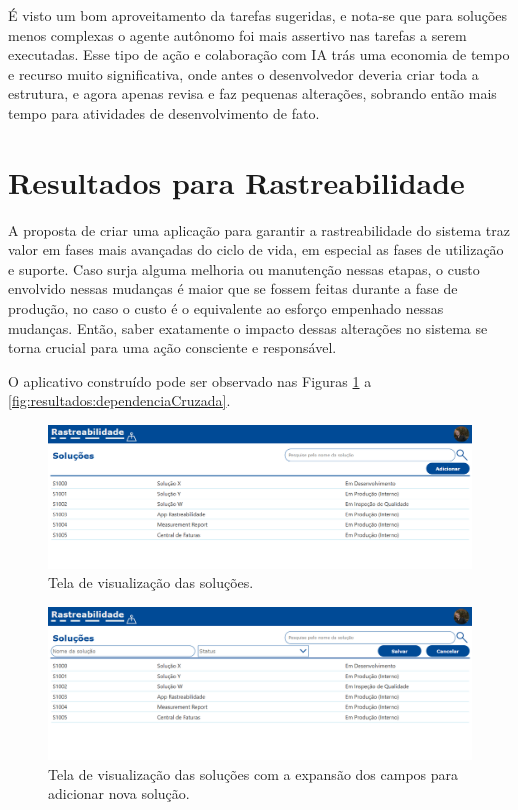 	É visto um bom aproveitamento da tarefas sugeridas, e nota-se que para soluções menos complexas o agente autônomo foi mais assertivo nas tarefas a serem executadas. Esse tipo de
	ação e colaboração com IA trás uma economia de tempo e recurso muito significativa, onde antes o desenvolvedor deveria criar toda a estrutura, e agora apenas revisa e faz pequenas alterações,
	sobrando então mais tempo para atividades de desenvolvimento de fato.

	\section{Resultados para Rastreabilidade}

	A proposta de criar uma aplicação para garantir a rastreabilidade do sistema traz valor em fases mais avançadas do ciclo de vida, em especial as fases de utilização e suporte. Caso surja
	alguma melhoria ou manutenção nessas etapas, o custo envolvido nessas mudanças é maior que se fossem feitas durante a fase de produção, no caso o custo é o equivalente ao esforço empenhado nessas
	mudanças. Então, saber exatamente o impacto dessas alterações no sistema se torna crucial para uma ação consciente e responsável.

	O aplicativo construído pode ser observado nas Figuras \ref{fig:resultados:solucoes} a \ref{fig:resultados:dependenciaCruzada}.

	\begin{figure}[!htb]
		\centering
		\includegraphics[width=1\textwidth]{./figuras/solucoes.png}
		\caption{Tela de visualização das soluções.}
		\label{fig:resultados:solucoes}
	\end{figure}

	\begin{figure}[!htb]
		\centering
		\includegraphics[width=1\textwidth]{./figuras/solucoesAdicionar.png}
		\caption{Tela de visualização das soluções com a expansão dos campos para adicionar nova solução.}
		\label{fig:resultados:solucoesAdicionar}
	\end{figure}

